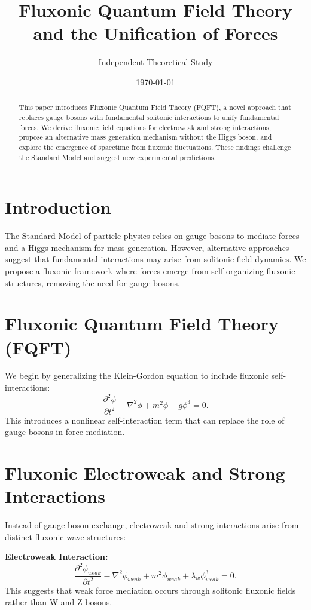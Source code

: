 \documentclass{article}
\title{Fluxonic Quantum Field Theory and the Unification of Forces}
\author{Independent Theoretical Study}
\date{\today}
\begin{document}
\maketitle

\begin{abstract}
This paper introduces Fluxonic Quantum Field Theory (FQFT), a novel approach that replaces gauge bosons with fundamental solitonic interactions to unify fundamental forces. We derive fluxonic field equations for electroweak and strong interactions, propose an alternative mass generation mechanism without the Higgs boson, and explore the emergence of spacetime from fluxonic fluctuations. These findings challenge the Standard Model and suggest new experimental predictions.
\end{abstract}

\section{Introduction}
The Standard Model of particle physics relies on gauge bosons to mediate forces and a Higgs mechanism for mass generation. However, alternative approaches suggest that fundamental interactions may arise from solitonic field dynamics. We propose a fluxonic framework where forces emerge from self-organizing fluxonic structures, removing the need for gauge bosons.

\section{Fluxonic Quantum Field Theory (FQFT)}
We begin by generalizing the Klein-Gordon equation to include fluxonic self-interactions:
\begin{equation}
    \frac{\partial^2 \phi}{\partial t^2} - \nabla^2 \phi + m^2 \phi + g \phi^3 = 0.
\end{equation}
This introduces a nonlinear self-interaction term that can replace the role of gauge bosons in force mediation.

\section{Fluxonic Electroweak and Strong Interactions}
Instead of gauge boson exchange, electroweak and strong interactions arise from distinct fluxonic wave structures:

\textbf{Electroweak Interaction:}
\begin{equation}
    \frac{\partial^2 \phi_{weak}}{\partial t^2} - \nabla^2 \phi_{weak} + m^2 \phi_{weak} + \lambda_w \phi_{weak}^3 = 0.
\end{equation}
This suggests that weak force mediation occurs through solitonic fluxonic fields rather than W and Z bosons.
\end{document}
